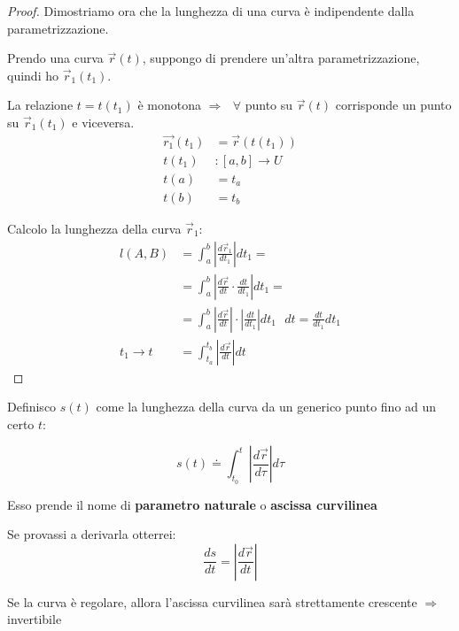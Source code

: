 \begin{proof}
    Dimostriamo ora che la lunghezza di una curva è indipendente dalla parametrizzazione.
    
    Prendo una curva $\vec r(t)$, suppongo di prendere un'altra parametrizzazione, quindi ho $\vec r_1(t_1)$.
    
    La relazione $t=t(t_1)$ è monotona $\Rightarrow ~~~\forall$ punto su $\vec r(t)$ corrisponde un punto su $\vec r_1(t_1)$ e viceversa.
    \begin{align*}
        \vec{r_1}(t_1) &= \vec r(t(t_1)) \\
        t(t_1) &: [a,b] \to U \\
        t(a) &= t_a\\
        t(b) &= t_b
    \end{align*}
    
    Calcolo la lunghezza della curva $\vec r_1$:
    \begin{align*}
        l(A,B) &= \int_a^b \left| \frac{d\vec r_1}{dt_1} \right| dt_1 =\\
        &= \int_a^b \left| \frac{d\vec r}{dt} \cdot \frac{dt}{dt_1} \right| dt_1 =\\
        &= \int_a^b \left| \frac{d\vec r}{dt} \right| \cdot \left| \frac{dt}{dt_1} \right| dt_1 ~~~dt=\frac{dt}{dt_1}dt_1 \\
        t_1\to t ~~~ &= \int_{t_a}^{t_b} \left| \frac{d\vec r}{dt} \right| dt
    \end{align*}
\end{proof}

\begin{definition}
    Definisco $s(t)$ come la lunghezza della curva da un generico punto fino ad un certo $t$:

    \begin{equation*}
        s(t) \doteq \int_{t_0}^t \left| \frac{d\vec r}{d\tau} \right| d\tau
    \end{equation*}

    Esso prende il nome di \textbf{parametro naturale} o \textbf{ascissa curvilinea}
\end{definition}

Se provassi a derivarla otterrei:
\begin{equation*}
    \frac{ds}{dt} = \left| \frac{d\vec r}{dt} \right|
\end{equation*}

Se la curva è regolare, allora l'ascissa curvilinea sarà strettamente crescente $\Rightarrow$ invertibile 

